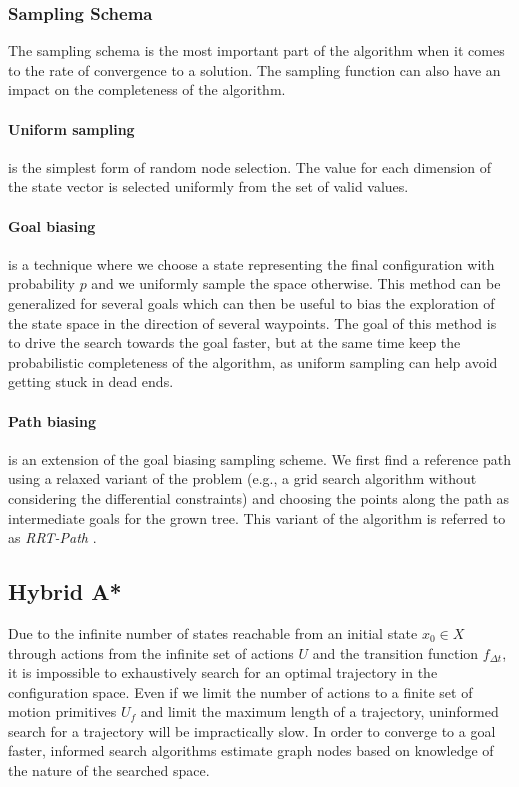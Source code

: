 \subsubsection{Sampling Schema}

The sampling schema is the most important part of the algorithm when it comes to the rate of convergence to a solution. The sampling function can also have an impact on the completeness of the algorithm.

\paragraph{Uniform sampling} is the simplest form of random node selection. The value for each dimension of the state vector is selected uniformly from the set of valid values.

\paragraph{Goal biasing} is a technique where we choose a state representing the final configuration with probability $p$ and we uniformly sample the space otherwise. This method can be generalized for several goals which can then be useful to bias the exploration of the state space in the direction of several waypoints. The goal of this method is to drive the search towards the goal faster, but at the same time keep the probabilistic completeness of the algorithm, as uniform sampling can help avoid getting stuck in dead ends.

\paragraph{Path biasing} is an extension of the goal biasing sampling scheme. We first find a reference path using a relaxed variant of the problem (e.g., a grid search algorithm without considering the differential constraints) and choosing the points along the path as intermediate goals for the grown tree. This variant of the algorithm is referred to as \textit{RRT-Path} \cite{RRT_guiding_path}.


\subsection{Hybrid A*}

Due to the infinite number of states reachable from an initial state $x_0\in X$ through actions from the infinite set of actions $U$ and the transition function $f_{\Delta t}$, it is impossible to exhaustively search for an optimal trajectory in the configuration space. Even if we limit the number of actions to a finite set of motion primitives $U_f$ and limit the maximum length of a trajectory, uninformed search for a trajectory will be impractically slow. In order to converge to a goal faster, informed search algorithms estimate graph nodes based on knowledge of the nature of the searched space.

